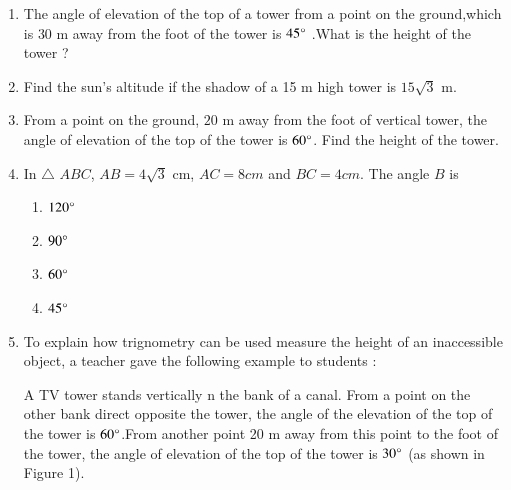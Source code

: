 \begin{enumerate}
	\hfill{}\item The angle of elevation of the top of a tower from a point on the ground,which is $30$ m away from the foot of the tower is $45\degree$ .What is the height of the tower ?
	\hfill{}\item Find the sun's altitude if the shadow of a 15 m high tower is ${15}\sqrt{3}$ m.
	\hfill{}\item From a point on the ground, $20$ m away from the foot of vertical tower, the angle of elevation of the top of the tower is $60\degree$. Find the height of the tower.
			\hfill{}\item In $\triangle$ $ABC$, $AB = {4\sqrt{3}}$ cm, $AC = 8 cm$ and $BC = 4 cm$. The angle $B$ is
				\begin{enumerate}
\item $120\degree$
\item $90\degree$
\item $60\degree$
\item $45\degree$
				\end{enumerate}
	\hfill{}\item To explain how trignometry can be used measure the height of an inaccessible object, a teacher gave the following example to students :

		A TV tower stands vertically n the bank of a canal. From a point on the other bank direct opposite the tower, the angle of the elevation of the top of the tower is $60\degree$.From another point 20 m away from this point to the foot of the tower, the angle of elevation of the top of the tower is $30\degree$ (as shown in Figure 1).


\end{enumerate}
